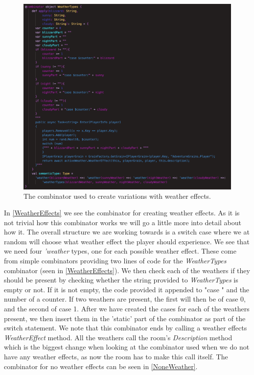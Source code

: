 \begin{figure}[H]
	\centering
	\includegraphics[width=\linewidth]{Materials/Decomposition/Room/WeatherEffects}
	\caption{The combinator used to create variations with weather effects.}
	\label{WeatherEffects}
\end{figure}
In \autoref{WeatherEffects} we see the combinator for creating weather effects. As it is not trivial how this combinator works we will go a little more into detail about how it. The overall structure we are working towards is a switch case where we at random will choose what weather effect the player should experience. We see that we need four \textit{'weather} types, one for each possible weather effect. These come from simple combinators providing two lines of code for the \textit{WeatherTypes} combinator (seen in \autoref{WeatherEffects}). We then check each of the weathers if they should be present by checking whether the string provided to \textit{WeatherTypes} is empty or not. If it is not empty, the code provided it appended to "case " and the number of a counter. If two weathers are present, the first will then be of case 0, and the second of case 1. After we have created the cases for each of the weathers present, we then insert them in the 'static' part of the combinator as part of the switch statement. We note that this combinator ends by calling a weather effects \textit{WeatherEffect} method. All the weathers call the room's \textit{Description} method which is the biggest change when looking at the combinator used when we do not have any weather effects, as now the room has to make this call itself. The combinator for no weather effects can be seen in \autoref{NoneWeather}.

